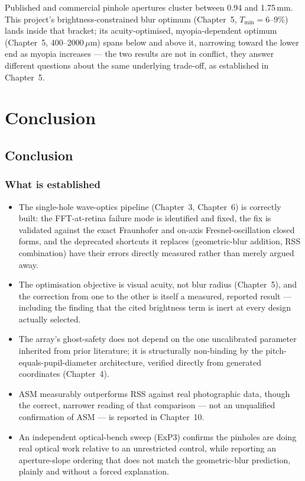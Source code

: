 \documentclass[11pt]{report}
\begin{document}
Published and commercial pinhole apertures cluster between 0.94 and 1.75\,mm. This
project's brightness-constrained blur optimum (Chapter~5, $T_{\min}=6$--9\%) lands inside
that bracket; its acuity-optimised, myopia-dependent optimum (Chapter~5, 400--2000\,$\mu$m)
spans below and above it, narrowing toward the lower end as myopia increases --- the two
results are not in conflict, they answer different questions about the same underlying
trade-off, as established in Chapter~5.

\part{Conclusion}

\chapter{Conclusion}

\section{What is established}

\begin{itemize}[leftmargin=1.2cm]
\item The single-hole wave-optics pipeline (Chapter~3, Chapter~6) is correctly built: the
FFT-at-retina failure mode is identified and fixed, the fix is validated against the exact
Fraunhofer and on-axis Fresnel-oscillation closed forms, and the deprecated shortcuts it
replaces (geometric-blur addition, RSS combination) have their errors directly measured
rather than merely argued away.
\item The optimisation objective is visual acuity, not blur radius (Chapter~5), and the
correction from one to the other is itself a measured, reported result --- including the
finding that the cited brightness term is inert at every design actually selected.
\item The array's ghost-safety does not depend on the one uncalibrated parameter inherited
from prior literature; it is structurally non-binding by the pitch-equals-pupil-diameter
architecture, verified directly from generated coordinates (Chapter~4).
\item ASM measurably outperforms RSS against real photographic data, though the correct,
narrower reading of that comparison --- not an unqualified confirmation of ASM --- is
reported in Chapter~10.
\item An independent optical-bench sweep (ExP3) confirms the pinholes are doing real
optical work relative to an unrestricted control, while reporting an aperture-slope
ordering that does not match the geometric-blur prediction, plainly and without a forced
explanation.
\end{itemize}
\end{document}

